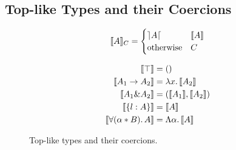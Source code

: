 \subsection{Top-like Types and their Coercions}\label{subsec:top-types}
\begin{figure}[!t]
\begin{spacing}{0.9}
\begin{minipage}[t]{.5\textwidth}
\vspace{-7pt}
  \begin{center} 
  \[
  \llbracket A \rrbracket_{C} = 
  \begin{cases} 
        \rceil A \lceil & \llbracket A \rrbracket \\ 
        \text{otherwise} & {C} 
  \end{cases}
  \]
  \end{center}
\end{minipage}
\begin{minipage}[t]{.5\textwidth}
\vspace{-7pt}
  \begin{align*} 
        \llbracket \top \rrbracket &= () \\
        \llbracket A_1 \to A_2 \rrbracket &= \lambda x.\, \llbracket A_2 \rrbracket \\
        \llbracket A_1 \& A_2 \rrbracket &= (\llbracket A_1 \rrbracket, \llbracket A_2 \rrbracket) \\
        \llbracket \{ l : A \} \rrbracket &= {\llbracket A \rrbracket} \\
        \llbracket \forall (\alpha * B).\, A \rrbracket &= \Lambda \alpha.\, \llbracket A \rrbracket 
  \end{align*}
\end{minipage}
\end{spacing}
  \caption{Top-like types and their coercions.}
  \label{fig:andcoercion}
\end{figure}

